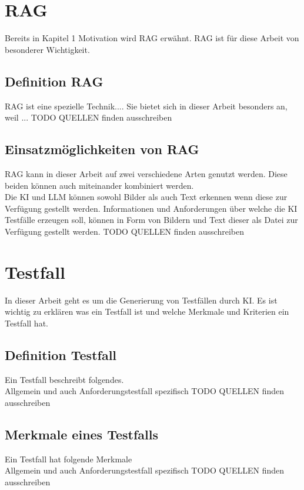 \documentclass[12pt,toc=bib,toc=listof]{scrreprt}
\begin{document}
\section{RAG} %
\label{sec:rag}
Bereits in Kapitel 1 Motivation wird RAG erwähnt. RAG ist für diese Arbeit von besonderer Wichtigkeit. 

\subsection{Definition RAG} %
\label{sec:definitionRAG}
RAG ist eine spezielle Technik.... Sie bietet sich in dieser Arbeit besonders an, weil ...
TODO QUELLEN finden ausschreiben

\subsection{Einsatzmöglichkeiten von RAG} %
\label{sec:einsatzmöglichkeitenVonRAG}
RAG kann in dieser Arbeit auf zwei verschiedene Arten genutzt werden. Diese beiden können auch miteinander kombiniert werden.\\
Die KI und LLM können sowohl Bilder als auch Text erkennen wenn diese zur Verfügung gestellt werden. Informationen und Anforderungen über welche die KI Testfälle erzeugen soll, können in Form von Bildern und Text dieser als Datei zur Verfügung gestellt werden.
TODO QUELLEN finden ausschreiben

\section{Testfall} %
\label{sec:testfall}
In dieser Arbeit geht es um die Generierung von Testfällen durch KI. Es ist wichtig zu erklären was ein Testfall ist und welche Merkmale und Kriterien ein Testfall hat. 

\subsection{Definition Testfall} %
\label{sec:definitionTestfall}
Ein Testfall beschreibt folgendes.\\
Allgemein und auch Anforderungstestfall spezifisch
TODO QUELLEN finden ausschreiben

\subsection{Merkmale eines Testfalls} %
\label{sec:merkmaleEinesTestfalls}
Ein Testfall hat folgende Merkmale\\
Allgemein und auch Anforderungstestfall spezifisch
TODO QUELLEN finden ausschreiben
\end{document}
